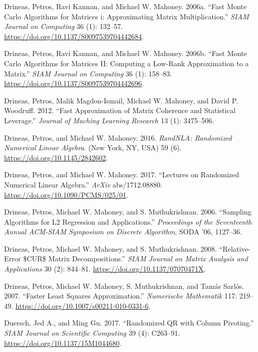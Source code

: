 \documentclass[
  12pt,
]{article}
\newlength{\cslhangindent}
\newenvironment{CSLReferences}[2] %
 {\begin{list}{}{%
  \setlength{\itemindent}{0pt}
  \setlength{\leftmargin}{0pt}
  \setlength{\parsep}{0pt}
  \ifodd #1
   \setlength{\leftmargin}{\cslhangindent}
   \setlength{\itemindent}{-1\cslhangindent}
  \fi
  \setlength{\itemsep}{#2\baselineskip}}}
 {\end{list}}
\begin{document}
\begin{CSLReferences}{1}{1}
Drineas, Petros, Ravi Kannan, and Michael W. Mahoney. 2006a. {``Fast
Monte Carlo Algorithms for Matrices i: Approximating Matrix
Multiplication.''} \emph{SIAM Journal on Computing} 36 (1): 132--57.
\url{https://doi.org/10.1137/S0097539704442684}.

Drineas, Petros, Ravi Kannan, and Michael W. Mahoney. 2006b. {``Fast
Monte Carlo Algorithms for Matrices II: Computing a Low-Rank
Approximation to a Matrix.''} \emph{SIAM Journal on Computing} 36 (1):
158--83. \url{https://doi.org/10.1137/S0097539704442696}.

Drineas, Petros, Malik Magdon-Ismail, Michael W. Mahoney, and David P.
Woodruff. 2012. {``Fast Approximation of Matrix Coherence and
Statistical Leverage.''} \emph{Journal of Maching Learning Research} 13
(1): 3475--506.

Drineas, Petros, and Michael W. Mahoney. 2016. \emph{RandNLA: Randomized
Numerical Linear Algebra}. (New York, NY, USA) 59 (6).
\url{https://doi.org/10.1145/2842602}.

Drineas, Petros, and Michael W. Mahoney. 2017. {``Lectures on Randomized
Numerical Linear Algebra.''} \emph{ArXiv} abs/1712.08880.
\url{https://doi.org/10.1090/PCMS/025/01}.

Drineas, Petros, Michael W. Mahoney, and S. Muthukrishnan. 2006.
{``Sampling Algorithms for L2 Regression and Applications.''}
\emph{Proceedings of the Seventeenth Annual ACM-SIAM Symposium on
Discrete Algorithm}, SODA '06, 1127--36.

Drineas, Petros, Michael W. Mahoney, and S. Muthukrishnan. 2008.
{``Relative-Error \$CUR\$ Matrix Decompositions.''} \emph{SIAM Journal
on Matrix Analysis and Applications} 30 (2): 844--81.
\url{https://doi.org/10.1137/07070471X}.

Drineas, Petros, Michael W. Mahoney, S. Muthukrishnan, and Tamás Sarlós.
2007. {``Faster Least Squares Approximation.''} \emph{Numerische
Mathematik} 117: 219--49.
\url{https://doi.org/10.1007/s00211-010-0331-6}.

Duersch, Jed A., and Ming Gu. 2017. {``Randomized QR with Column
Pivoting.''} \emph{SIAM Journal on Scientific Computing} 39 (4):
C263--91. \url{https://doi.org/10.1137/15M1044680}.


\end{CSLReferences}
\end{document}
